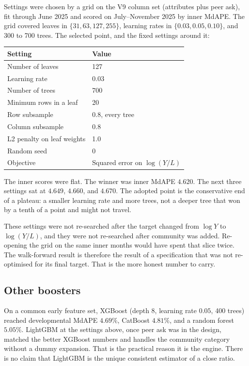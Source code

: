 \documentclass[11pt]{article}
\begin{document}
Settings were chosen by a grid on the V9 column set (attributes plus peer ask), fit through June 2025 and scored on July--November 2025 by inner MdAPE. The grid covered leaves in \(\{31, 63, 127, 255\}\), learning rates in \(\{0.03, 0.05, 0.10\}\), and 300 to 700 trees. The selected point, and the fixed settings around it:

\begin{center}
\begin{tabular}{ll}
\toprule
Setting & Value \\
\midrule
Number of leaves & 127 \\
Learning rate & 0.03 \\
Number of trees & 700 \\
Minimum rows in a leaf & 20 \\
Row subsample & 0.8, every tree \\
Column subsample & 0.8 \\
L2 penalty on leaf weights & 1.0 \\
Random seed & 0 \\
Objective & Squared error on \(\log(Y/L)\) \\
\bottomrule
\end{tabular}
\end{center}

The inner scores were flat. The winner was inner MdAPE \(4.620\). The next three settings sat at \(4.649\), \(4.660\), and \(4.670\). The adopted point is the conservative end of a plateau: a smaller learning rate and more trees, not a deeper tree that won by a tenth of a point and might not travel.

These settings were not re-searched after the target changed from \(\log Y\) to \(\log(Y/L)\), and they were not re-searched after community was added. Re-opening the grid on the same inner months would have spent that slice twice. The walk-forward result is therefore the result of a specification that was not re-optimised for its final target. That is the more honest number to carry.

\subsection{Other boosters}

On a common early feature set, XGBoost (depth 8, learning rate \(0.05\), 400 trees) reached developmental MdAPE \(4.69\%\), CatBoost \(4.81\%\), and a random forest \(5.05\%\). LightGBM at the settings above, once peer ask was in the design, matched the better XGBoost numbers and handles the community category without a dummy expansion. That is the practical reason it is the engine. There is no claim that LightGBM is the unique consistent estimator of a close ratio.
\end{document}
